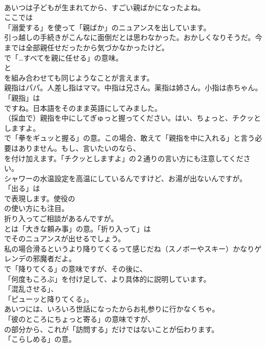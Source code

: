 \documentclass[8pt]{extreport}
\begin{document}
\begin{CJK}{UTF8}{min}
\\	あいつは子どもが生まれてから、すごい親ばかになったよね。 
\\	ここでは
\\	「溺愛する」を使って「親ばか」のニュアンスを出しています。	
\\	引っ越しの手続きがこんなに面倒だとは思わなかった。おかしくなりそうだ。今までは全部親任せだったから気づかなかったけど。 
\\	で「…すべてを親に任せる」の意味。
\\	と 
\\	を組み合わせても同じようなことが言えます。	
\\	親指はパパ。人差し指はママ。中指は兄さん。薬指は姉さん。小指は赤ちゃん。 
\\	「親指」は
\\	ですね。日本語をそのまま英語にしてみました。	
\\	（採血で）親指を中にしてぎゅっと握ってください。はい、ちょっと、チクッとしますよ。 
\\	で「拳をギュッと握る」の意。この場合、敢えて「親指を中に入れる」と言う必要はありません。もし、言いたいのなら、
\\	を付け加えます。「チクッとしますよ」の２通りの言い方にも注意してください。	
\\	シャワーの水温設定を高温にしているんですけど、お湯が出ないんですが。 
\\	「出る」は 
\\	で表現します。使役の 
\\	の使い方にも注目。	
\\	折り入ってご相談があるんですが。 
\\	とは「大きな頼み事」の意。「折り入って」は
\\	でそのニュアンスが出せるでしょう。	
\\	私の場合滑るというより降りてくるって感じだね（スノボーやスキー）かなりゲレンデの邪魔者だよ。 
\\	で「降りてくる」の意味ですが、その後に、
\\	「何度もころぶ」を付け足して、より具体的に説明しています。
\\	「混乱させる」、
\\	「ピューッと降りてくる」。	
\\	あいつには、いろいろ世話になったからお礼参りに行かなくちゃ。 
\\	「彼のところにちょっと寄る」の意味ですが、
\\	の部分から、これが「訪問する」だけではないことが伝わります。
\\	「こらしめる」の意。	

\end{CJK}
\end{document}
